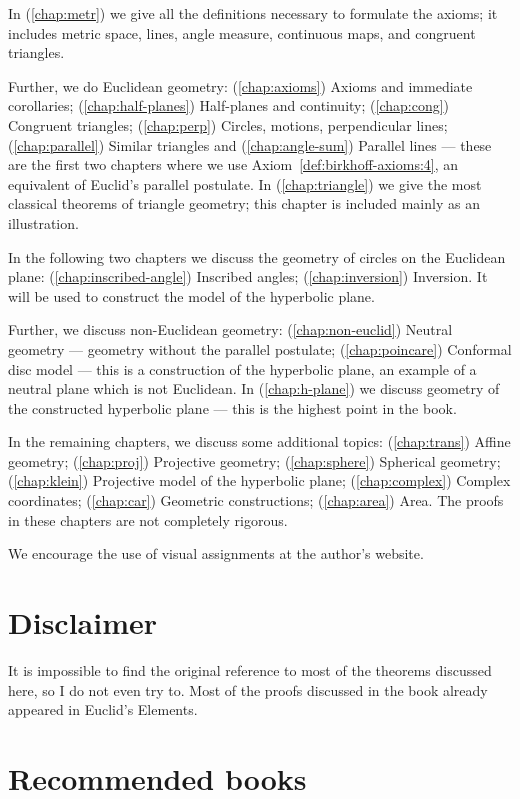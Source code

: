 In (\ref{chap:metr}) we give all the definitions necessary to formulate the axioms;
it includes metric space, 
lines, 
angle measure, 
continuous maps,
and congruent triangles.

Further, we do Euclidean geometry:
(\ref{chap:axioms}) Axioms and immediate corollaries;
(\ref{chap:half-planes}) Half-planes and continuity;
(\ref{chap:cong}) Congruent triangles;
(\ref{chap:perp}) Circles, motions, perpendicular lines;
(\ref{chap:parallel}) Similar triangles and (\ref{chap:angle-sum}) Parallel lines  
--- these are the first two chapters where we use Axiom~\ref{def:birkhoff-axioms:4}, an equivalent of Euclid's parallel postulate.
In (\ref{chap:triangle}) we give the most classical theorems of triangle geometry;
this chapter is included mainly as an illustration.

In the following two chapters we discuss the geometry of circles on the Euclidean plane:
(\ref{chap:inscribed-angle}) Inscribed angles; (\ref{chap:inversion}) Inversion.
It  will be used to construct the model of the hyperbolic plane.

Further, we discuss non-Euclidean geometry:
(\ref{chap:non-euclid})
Neutral geometry --- geometry without the parallel postulate;
(\ref{chap:poincare})
Conformal disc model ---
this is a construction of the hyperbolic plane,
an example of a neutral plane which is not Euclidean.
In (\ref{chap:h-plane}) we discuss geometry of the constructed hyperbolic plane --- this is the highest point in the book.

In the remaining chapters, we discuss some additional topics:
(\ref{chap:trans}) Affine geometry;
(\ref{chap:proj}) Projective geometry;
(\ref{chap:sphere}) Spherical geometry;
(\ref{chap:klein}) Projective model of the hyperbolic plane;
(\ref{chap:complex}) Complex coordinates;
(\ref{chap:car}) Geometric constructions;
(\ref{chap:area}) Area.
The proofs in these chapters are not completely rigorous.

We encourage the use of visual assignments at the author's website.

\section{Disclaimer}

It is  impossible to find the original reference to most of the theorems discussed here, so I do not even try to.
Most of the proofs discussed in the book 
already appeared in Euclid's Elements.

\section{Recommended books}

